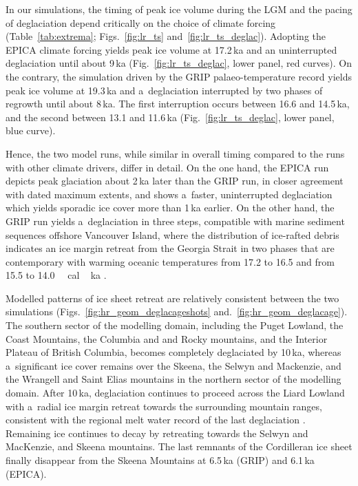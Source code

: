 \documentclass[tc, manuscript]{copernicus}
\begin{document}
      In our simulations, the timing of peak ice volume during the LGM and
      the pacing of deglaciation depend critically on the choice of climate
      forcing (Table~\ref{tab:extrema}; Figs.~\ref{fig:lr_ts}
      and~\ref{fig:lr_ts_deglac}). Adopting the EPICA climate forcing yields
      peak ice volume at 17.2\,\unit{ka} and an uninterrupted deglaciation
      until about 9\,\unit{ka} (Fig.~\ref{fig:lr_ts_deglac}, lower panel,
      red curves). On the contrary, the simulation driven by the GRIP
      palaeo-temperature record yields peak ice volume at 19.3\,\unit{ka}
      and a~deglaciation interrupted by two phases of regrowth until about
      8\,\unit{ka}. The first interruption occurs between 16.6 and
      14.5\,\unit{ka}, and the second between 13.1 and 11.6\,\unit{ka}
      (Fig.~\ref{fig:lr_ts_deglac}, lower panel, blue curve).

      Hence, the two model runs, while similar in overall timing compared to
      the runs with other climate drivers, differ in detail. On the one
      hand, the EPICA run depicts peak glaciation about 2\,\unit{ka} later
      than the GRIP run, in closer agreement with dated maximum extents, and
      shows a~faster, uninterrupted deglaciation which yields sporadic ice
      cover more than 1\,\unit{ka} earlier. On the other hand, the GRIP run
      yields a~deglaciation in three steps, compatible with marine sediment
      sequences offshore Vancouver Island, where the distribution of
      ice-rafted debris indicates an ice margin retreat from the Georgia
      Strait in two phases that are contemporary with warming oceanic
      temperatures from 17.2 to 16.5 and from 15.5 to
      14.0\,\unit{\,cal\,ka} \citep{Taylor.etal.2014}.

      Modelled patterns of ice sheet retreat are relatively consistent
      between the two simulations (Figs.~\ref{fig:hr_geom_deglacageshots}
      and.~\ref{fig:hr_geom_deglacage}). The southern sector of the
      modelling domain, including the Puget Lowland, the Coast Mountains,
      the Columbia and and Rocky mountains, and the Interior Plateau of
      British Columbia, becomes completely deglaciated by 10\,\unit{ka},
      whereas a~significant ice cover remains over the Skeena, the Selwyn
      and Mackenzie, and the Wrangell and Saint Elias mountains in the
      northern sector of the modelling domain. After 10\,\unit{ka},
      deglaciation continues to proceed across the Liard Lowland with
      a~radial ice margin retreat towards the surrounding mountain ranges,
      consistent with the regional melt water record of the last
      deglaciation \citep{Margold.etal.2013}. Remaining ice continues to
      decay by retreating towards the Selwyn and MacKenzie, and Skeena
      mountains. The last remnants of the Cordilleran ice sheet finally
      disappear from the Skeena Mountains at 6.5\,\unit{ka} (GRIP) and
      6.1\,\unit{ka} (EPICA).
\end{document}
